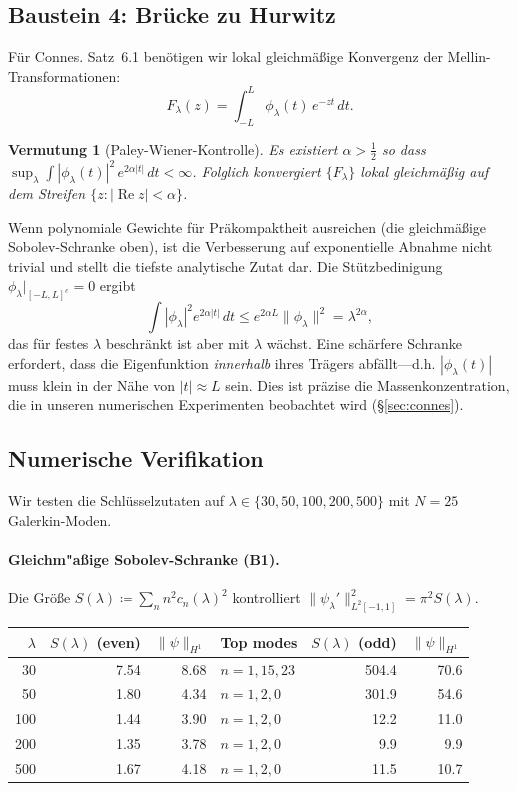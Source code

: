 \documentclass[12pt,a4paper]{article}
\newtheorem{conjecture}[theorem]{Vermutung}
\theoremstyle{definition}
\theoremstyle{remark}
\begin{document}
\subsection{Baustein 4: Br\"ucke zu Hurwitz}

Für Connes. Satz~6.1 benötigen wir lokal gleichmäßige Konvergenz der Mellin-Transformationen:
\[
  F_\lambda(z) = \int_{-L}^{L} \phi_\lambda(t)\,e^{-zt}\,dt.
\]

\begin{conjecture}[Paley-Wiener-Kontrolle]
\label{conj:pw}
Es existiert $\alpha > \tfrac{1}{2}$ so dass $\sup_\lambda \int |\phi_\lambda(t)|^2\,e^{2\alpha|t|}\,dt < \infty$. Folglich konvergiert $\{F_\lambda\}$ lokal gleichmäßig auf dem Streifen $\{z : |\operatorname{Re} z| < \alpha\}$.
\end{conjecture}

Wenn polynomiale Gewichte für Präkompaktheit ausreichen (die gleichmäßige Sobolev-Schranke oben), ist die Verbesserung auf exponentielle Abnahme nicht trivial und stellt die tiefste analytische Zutat dar. Die Stützbedinigung $\phi_\lambda|_{[-L,L]^c} = 0$ ergibt
\[
  \int |\phi_\lambda|^2 e^{2\alpha|t|}\,dt \leq e^{2\alpha L}\|\phi_\lambda\|^2 = \lambda^{2\alpha},
\]
das für festes $\lambda$ beschränkt ist aber mit $\lambda$ wächst. Eine schärfere Schranke erfordert, dass die Eigenfunktion \emph{innerhalb} ihres Trägers abfällt---d.h. $|\phi_\lambda(t)|$ muss klein in der Nähe von $|t| \approx L$ sein. Dies ist präzise die Massenkonzentration, die in unseren numerischen Experimenten beobachtet wird (\S\ref{sec:connes}).

\subsection{Numerische Verifikation}
\label{sec:wc-numerics}

Wir testen die Schlüsselzutaten auf $\lambda \in \{30, 50, 100, 200, 500\}$ mit $N = 25$ Galerkin-Moden.

\paragraph{Gleichm"a\ss ige Sobolev-Schranke (B1).}
Die Größe $S(\lambda) \coloneqq \sum_{n} n^2 c_n(\lambda)^2$ kontrolliert $\|\psi_\lambda'\|_{L^2[-1,1]}^2 = \pi^2 S(\lambda)$.

\begin{center}
\small
\renewcommand{\arraystretch}{1.15}
\begin{tabular}{r|r|r|l||r|r}
$\lambda$ & $S(\lambda)$ (even) & $\|\psi\|_{H^1}$ & Top modes & $S(\lambda)$ (odd) & $\|\psi\|_{H^1}$ \\\hline
30  & 7.54  & 8.68  & $n = 1,15,23$ & 504.4  & 70.6 \\
50  & 1.80  & 4.34  & $n = 1,2,0$   & 301.9  & 54.6 \\
100 & 1.44  & 3.90  & $n = 1,2,0$   & 12.2   & 11.0 \\
200 & 1.35  & 3.78  & $n = 1,2,0$   & 9.9    & 9.9  \\
500 & 1.67  & 4.18  & $n = 1,2,0$   & 11.5   & 10.7
\end{tabular}
\end{center}
\end{document}

